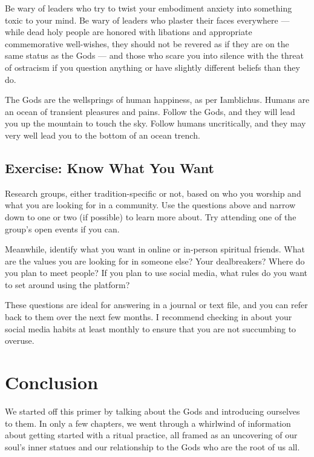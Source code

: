 \documentclass[
]{book}
\begin{document}
Be wary of leaders who try to twist your embodiment anxiety into something toxic to your mind. Be wary of leaders who plaster their faces everywhere --- while dead holy people are honored with libations and appropriate commemorative well-wishes, they should not be revered as if they are on the same status as the Gods --- and those who scare you into silence with the threat of ostracism if you question anything or have slightly different beliefs than they do.

The Gods are the wellsprings of human happiness, as per Iamblichus. Humans are an ocean of transient pleasures and pains. Follow the Gods, and they will lead you up the mountain to touch the sky. Follow humans uncritically, and they may very well lead you to the bottom of an ocean trench.

\hypertarget{exercise-know-what-you-want}{%
\section{Exercise: Know What You Want}\label{exercise-know-what-you-want}}

Research groups, either tradition-specific or not, based on who you worship and what you are looking for in a community. Use the questions above and narrow down to one or two (if possible) to learn more about. Try attending one of the group's open events if you can.

Meanwhile, identify what you want in online or in-person spiritual friends. What are the values you are looking for in someone else? Your dealbreakers? Where do you plan to meet people? If you plan to use social media, what rules do you want to set around using the platform?

These questions are ideal for answering in a journal or text file, and you can refer back to them over the next few months. I recommend checking in about your social media habits at least monthly to ensure that you are not succumbing to overuse.

\hypertarget{conclusion}{%
\chapter{Conclusion}\label{conclusion}}

We started off this primer by talking about the Gods and introducing ourselves to them. In only a few chapters, we went through a whirlwind of information about getting started with a ritual practice, all framed as an uncovering of our soul's inner statues and our relationship to the Gods who are the root of us all.
\end{document}
